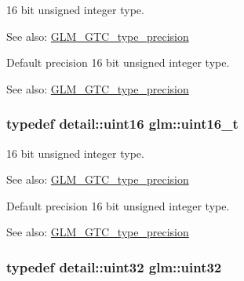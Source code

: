 16 bit unsigned integer type. \begin{Desc}
\item[See also:]\hyperlink{group__gtc__type__precision}{GLM\_\-GTC\_\-type\_\-precision}\end{Desc}
Default precision 16 bit unsigned integer type. \begin{Desc}
\item[See also:]\hyperlink{group__gtc__type__precision}{GLM\_\-GTC\_\-type\_\-precision} \end{Desc}
\hypertarget{group__gtc__type__precision_gc4eb4f43cae8129b00086dc234d3b8fc}{
\subsubsection[uint16\_\-t]{\setlength{\rightskip}{0pt plus 5cm}typedef detail::uint16 {\bf glm::uint16\_\-t}}}
\label{group__gtc__type__precision_gc4eb4f43cae8129b00086dc234d3b8fc}


16 bit unsigned integer type. \begin{Desc}
\item[See also:]\hyperlink{group__gtc__type__precision}{GLM\_\-GTC\_\-type\_\-precision}\end{Desc}
Default precision 16 bit unsigned integer type. \begin{Desc}
\item[See also:]\hyperlink{group__gtc__type__precision}{GLM\_\-GTC\_\-type\_\-precision} \end{Desc}
\hypertarget{group__gtc__type__precision_g202b6a53c105fcb7e531f9b443518451}{
\subsubsection[uint32]{\setlength{\rightskip}{0pt plus 5cm}typedef detail::uint32 {\bf glm::uint32}}}
\label{group__gtc__type__precision_g202b6a53c105fcb7e531f9b443518451}


